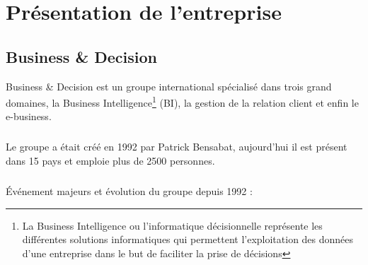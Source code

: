 \chapter{Présentation de l'entreprise}
\section{Business \& Decision}

        Business \& Decision est un groupe international spécialisé dans trois grand domaines, la Business Intelligence\footnote{La Business Intelligence ou l'informatique décisionnelle représente les différentes solutions informatiques qui permettent l'exploitation des données d'une entreprise dans le but de faciliter la prise de décisions} (BI), la gestion de la relation client et enfin le e-business. 
\paragraph{}
        Le groupe a était créé en 1992 par Patrick Bensabat, aujourd'hui il est présent dans 15 pays et emploie plus de 2500 personnes.
\paragraph{}
       	  Événement majeurs et évolution du groupe depuis 1992 : 

